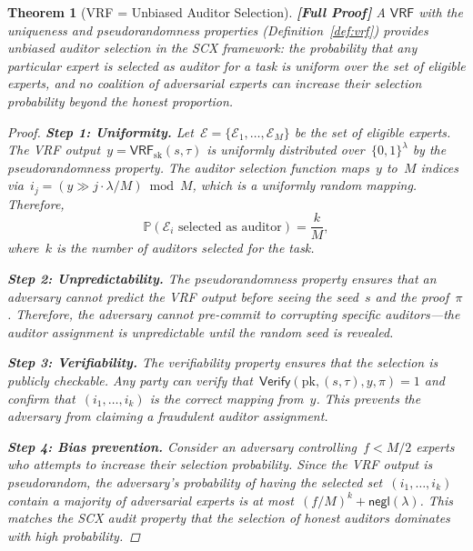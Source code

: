 \documentclass[12pt,a4paper]{article}
\newtheorem{theorem}{Theorem}[section]
\theoremstyle{remark}
\newcommand{\Pbb}{\mathbb{P}}
\newcommand{\SCX}{\textsf{SCX}}
\newcommand{\VRF}{\textsf{VRF}}
\newcommand{\Verify}{\textsf{Verify}}
\newcommand{\negl}{\textsf{negl}}
\newcommand{\rigorFull}{\textbf{[Full Proof]}}
\begin{document}
\begin{theorem}[VRF = Unbiased Auditor Selection]
\label{thm:vrf_selection}
\rigorFull
A $\VRF$ with the uniqueness and pseudorandomness properties (Definition~\ref{def:vrf}) provides unbiased auditor selection in the \SCX{} framework: the probability that any particular expert is selected as auditor for a task is uniform over the set of eligible experts, and no coalition of adversarial experts can increase their selection probability beyond the honest proportion.

\begin{proof}
\noindent\textbf{Step 1: Uniformity.}
Let~$\mathcal{E} = \{\mathcal{E}_1, \ldots, \mathcal{E}_M\}$ be the set of eligible experts. The VRF output~$y = \VRF_{\text{sk}}(s, \tau)$ is uniformly distributed over~$\{0,1\}^{\lambda}$ by the pseudorandomness property. The auditor selection function maps~$y$ to~$M$ indices via~$i_j = (y \gg j \cdot \lambda/M) \bmod M$, which is a uniformly random mapping. Therefore,
\[
  \Pbb(\mathcal{E}_i \text{ selected as auditor}) = \frac{k}{M},
\]
where~$k$ is the number of auditors selected for the task.

\smallskip
\noindent\textbf{Step 2: Unpredictability.}
The pseudorandomness property ensures that an adversary cannot predict the VRF output before seeing the seed~$s$ and the proof~$\pi$. Therefore, the adversary cannot pre-commit to corrupting specific auditors---the auditor assignment is unpredictable until the random seed is revealed.

\smallskip
\noindent\textbf{Step 3: Verifiability.}
The verifiability property ensures that the selection is publicly checkable. Any party can verify that~$\Verify(\text{pk}, (s, \tau), y, \pi) = 1$ and confirm that~$(i_1, \ldots, i_k)$ is the correct mapping from~$y$. This prevents the adversary from claiming a fraudulent auditor assignment.

\smallskip
\noindent\textbf{Step 4: Bias prevention.}
Consider an adversary controlling~$f < M/2$ experts who attempts to increase their selection probability. Since the VRF output is pseudorandom, the adversary's probability of having the selected set~$(i_1, \ldots, i_k)$ contain a majority of adversarial experts is at most~$(f/M)^k + \negl(\lambda)$. This matches the \SCX{} audit property that the selection of honest auditors dominates with high probability.
\end{proof}
\end{theorem}
\end{document}
